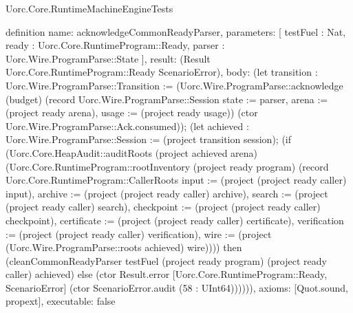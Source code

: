 \begin{lexlean}{Uorc.Core.RuntimeMachineEngineTests}
\begin{semanticmodule}
definition{
  name: acknowledgeCommonReadyParser,
  parameters: [
    testFuel : Nat,
    ready : Uorc.Core.RuntimeProgram::Ready,
    parser : Uorc.Wire.ProgramParse::State
  ],
  result: (Result Uorc.Core.RuntimeProgram::Ready ScenarioError),
  body: (let transition : Uorc.Wire.ProgramParse::Transition := (Uorc.Wire.ProgramParse::acknowledge (budget) (record Uorc.Wire.ProgramParse::Session {state := parser, arena := (project ready arena), usage := (project ready usage)}) (ctor Uorc.Wire.ProgramParse::Ack.consumed)); (let achieved : Uorc.Wire.ProgramParse::Session := (project transition session); (if (Uorc.Core.HeapAudit::auditRoots (project achieved arena) (Uorc.Core.RuntimeProgram::rootInventory (project ready program) (record Uorc.Core.RuntimeProgram::CallerRoots {input := (project (project ready caller) input), archive := (project (project ready caller) archive), search := (project (project ready caller) search), checkpoint := (project (project ready caller) checkpoint), certificate := (project (project ready caller) certificate), verification := (project (project ready caller) verification), wire := (project (Uorc.Wire.ProgramParse::roots achieved) wire)}))) then (cleanCommonReadyParser testFuel (project ready program) (project ready caller) achieved) else (ctor Result.error [Uorc.Core.RuntimeProgram::Ready, ScenarioError] (ctor ScenarioError.audit (58 : UInt64)))))),
  axioms: [Quot.sound, propext],
  executable: false
}


\end{semanticmodule}
\end{lexlean}
